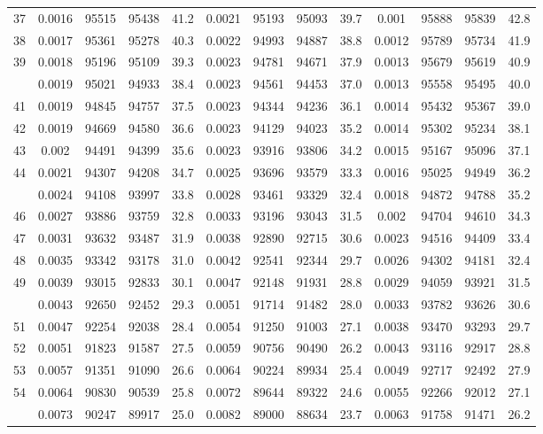 \documentclass[
  14pt,
]{article}
\begin{document}
\begin{longtable}[t]{lcccccccccccc}
37 & 0.0016 & 95515 & 95438 & 41.2 & 0.0021 & 95193 & 95093 & 39.7 & 0.001 & 95888 & 95839 & 42.8\\
38 & 0.0017 & 95361 & 95278 & 40.3 & 0.0022 & 94993 & 94887 & 38.8 & 0.0012 & 95789 & 95734 & 41.9\\
39 & 0.0018 & 95196 & 95109 & 39.3 & 0.0023 & 94781 & 94671 & 37.9 & 0.0013 & 95679 & 95619 & 40.9\\
\addlinespace
40 & 0.0019 & 95021 & 94933 & 38.4 & 0.0023 & 94561 & 94453 & 37.0 & 0.0013 & 95558 & 95495 & 40.0\\
41 & 0.0019 & 94845 & 94757 & 37.5 & 0.0023 & 94344 & 94236 & 36.1 & 0.0014 & 95432 & 95367 & 39.0\\
42 & 0.0019 & 94669 & 94580 & 36.6 & 0.0023 & 94129 & 94023 & 35.2 & 0.0014 & 95302 & 95234 & 38.1\\
43 & 0.002 & 94491 & 94399 & 35.6 & 0.0023 & 93916 & 93806 & 34.2 & 0.0015 & 95167 & 95096 & 37.1\\
44 & 0.0021 & 94307 & 94208 & 34.7 & 0.0025 & 93696 & 93579 & 33.3 & 0.0016 & 95025 & 94949 & 36.2\\
\addlinespace
45 & 0.0024 & 94108 & 93997 & 33.8 & 0.0028 & 93461 & 93329 & 32.4 & 0.0018 & 94872 & 94788 & 35.2\\
46 & 0.0027 & 93886 & 93759 & 32.8 & 0.0033 & 93196 & 93043 & 31.5 & 0.002 & 94704 & 94610 & 34.3\\
47 & 0.0031 & 93632 & 93487 & 31.9 & 0.0038 & 92890 & 92715 & 30.6 & 0.0023 & 94516 & 94409 & 33.4\\
48 & 0.0035 & 93342 & 93178 & 31.0 & 0.0042 & 92541 & 92344 & 29.7 & 0.0026 & 94302 & 94181 & 32.4\\
49 & 0.0039 & 93015 & 92833 & 30.1 & 0.0047 & 92148 & 91931 & 28.8 & 0.0029 & 94059 & 93921 & 31.5\\
\addlinespace
50 & 0.0043 & 92650 & 92452 & 29.3 & 0.0051 & 91714 & 91482 & 28.0 & 0.0033 & 93782 & 93626 & 30.6\\
51 & 0.0047 & 92254 & 92038 & 28.4 & 0.0054 & 91250 & 91003 & 27.1 & 0.0038 & 93470 & 93293 & 29.7\\
52 & 0.0051 & 91823 & 91587 & 27.5 & 0.0059 & 90756 & 90490 & 26.2 & 0.0043 & 93116 & 92917 & 28.8\\
53 & 0.0057 & 91351 & 91090 & 26.6 & 0.0064 & 90224 & 89934 & 25.4 & 0.0049 & 92717 & 92492 & 27.9\\
54 & 0.0064 & 90830 & 90539 & 25.8 & 0.0072 & 89644 & 89322 & 24.6 & 0.0055 & 92266 & 92012 & 27.1\\
\addlinespace
55 & 0.0073 & 90247 & 89917 & 25.0 & 0.0082 & 89000 & 88634 & 23.7 & 0.0063 & 91758 & 91471 & 26.2\\

\end{longtable}
\end{document}
